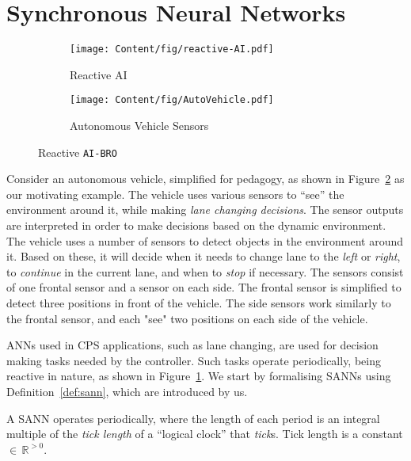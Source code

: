 \section{Synchronous Neural Networks}
\begin{figure}[b]
	
	\begin{subfigure}[t]{0.24\textwidth}
		\texttt{[image: Content/fig/reactive-AI.pdf]}
		\caption{Reactive \ac{AI}}
		\label{fig:reactive-ai}
	\end{subfigure}%
	\begin{subfigure}[t]{0.24\textwidth}
		\texttt{[image: Content/fig/AutoVehicle.pdf]}
		\captionsetup{justification=centering}
		\caption{Autonomous Vehicle Sensors}
		\label{fig:av}
	\end{subfigure}
	
	\caption{Reactive \texttt{AI-BRO}}
	\label{fig:reactive-aibro}
\end{figure}

Consider an autonomous vehicle, simplified for pedagogy, as shown in Figure~\ref{fig:av} as our motivating example.
The vehicle uses various sensors  to ``see'' the environment around it, while making \emph{lane changing decisions}. 
The sensor outputs are interpreted in order to make decisions based on the dynamic environment. 
The vehicle uses a number of sensors to detect objects in the environment around it. Based on these, it will decide when it needs to change lane
to the \emph{left} or \emph{right}, to \emph{continue} in the current lane, and when to \emph{stop} if necessary. 
The sensors consist of one frontal sensor and a sensor on each side.
The frontal sensor is simplified to detect three positions in front of the vehicle. The side sensors work similarly to the frontal sensor,
and each "see" two positions on each side of the vehicle. 

\acp{ANN} used in \ac{CPS} applications, such as lane changing, are used for decision making tasks 
needed by the controller. Such tasks operate periodically, being reactive in nature,
as shown in Figure~\ref{fig:reactive-ai}. We start by formalising \acp{SANN} using Definition~\ref{def:sann},
which are introduced by us. 

\begin{definition}
	\label{def:sann}
	A \acf{SANN} operates periodically, where the length of each period is 
	an integral multiple of the \emph{tick length} of a ``logical clock'' that \emph{tick}s. Tick length
	is a constant $\in \, \mathbb{R}^{>0}$.
\end{definition}

